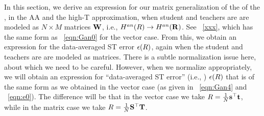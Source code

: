 In this section, we derive an expression for our matrix generalization of the \AnnealedHamiltonian of the \LinearPerceptron,
in the AA and the high-T approximation, when student and teachers are are modeled as $N \times M$ matrices ${\mathbf{W}}$,
i.e., $H^{an}(R)\rightarrow H^{an}(\mathbf{R})$.
See \EQN~\ref{xxx}, which has the same form as \EQN~\ref{eqn:Gan0} for the vector case.
%
From this, we obtain an expression for the data-averaged ST error $\epsilon(R)$, again when the student and teachers are are modeled as matrices.
There is a subtle normalization issue here, about which we need to be careful.
However, when we normalize appropriately, we will obtain an expression
for ``data-averaged ST error'' (i.e., \EffectivePotential) $\epsilon(R)$ that is of the same form as we obtained in the vector case (as given in \EQN~\ref{eqn:Gan4} and \EQN~\ref{eqn:e0}).
%
The difference will be that in the vector case we take $R=\tfrac{1}{N}{\mathbf{s}}^{\top}{\mathbf{t}}$, while in the matrix case we take $R=\tfrac{1}{N}{\mathbf{S}}^{\top}{\mathbf{T}}$.

